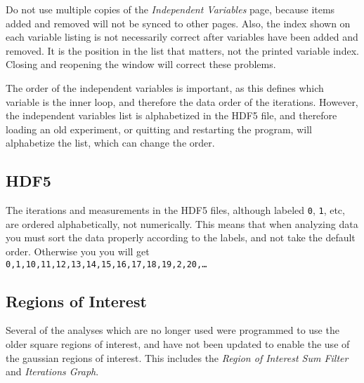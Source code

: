 \documentclass[pdftex,11pt,letterpaper]{article}
\begin{document}
Do not use multiple copies of the \textit{Independent Variables} page, because items added and removed will not be synced to other pages.  Also, the index shown on each variable listing is not necessarily correct after variables have been added and removed.  It is the position in the list that matters, not the printed variable index.  Closing and reopening the window will correct these problems.

The order of the independent variables is important, as this defines which variable is the inner loop, and therefore the data order of the iterations.  However, the independent variables list is alphabetized in the HDF5 file, and therefore loading an old experiment, or quitting and restarting the program, will alphabetize the list, which can change the order.

\subsection{HDF5}
The iterations and measurements in the HDF5 files, although labeled \texttt{0}, \texttt{1}, etc, are ordered alphabetically, not numerically.  This means that when analyzing data you must sort the data properly according to the labels, and not take the default order.  Otherwise you you will get\\ \texttt{0,1,10,11,12,13,14,15,16,17,18,19,2,20,\dots}

\subsection{Regions of Interest}

Several of the analyses which are no longer used were  programmed to use the older square regions of interest, and have not been updated to enable the use of the gaussian regions of interest.  This includes the \textit{Region of Interest Sum Filter} and \textit{Iterations Graph}.
\end{document}
